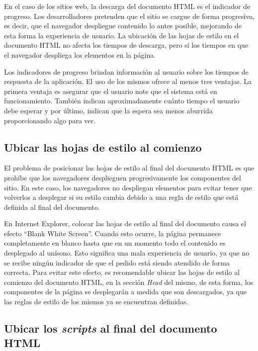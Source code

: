 En el caso de los sitios web, la descarga del documento HTML es el indicador de progreso. Los desarrolladores pretenden que el sitio se cargue de forma progresiva, es decir, que el
navegador despliegue contenido lo antes posible, mejorando de esta forma la experiencia de usuario. La ubicación de las hojas de estilo en el documento HTML no afecta
los tiempos de descarga, pero sí los tiempos en que el navegador despliega los elementos en la página.

Los indicadores de progreso brindan información al usuario sobre los tiempos de respuesta de la aplicación. El uso de los mismos ofrece al menos tres ventajas. La primera
ventaja es asegurar que el usuario note que el sistema está en funcionamiento. También indican aproximadamente cuánto tiempo el usuario debe esperar y por último, indican
que la espera sea menos aburrida proporcionando algo para ver.

\subsection{Ubicar las hojas de estilo al comienzo}

El problema de posicionar las hojas de estilo al final del documento HTML es que prohíbe que los navegadores desplieguen progresivamente los componentes del sitio.
En este caso, los navegadores no despliegan elementos para evitar tener que volverlos a desplegar si su estilo cambia debido a una regla de estilo que está definida al final del documento.

En Internet Explorer, colocar las hojas de estilo al final del documento causa el efecto ``Blank White Screen''. Cuando esto ocurre, la página permanece completamente
en blanco hasta que en un momento todo el contenido es desplegado al unísono. Esto significa una mala experiencia de usuario, ya que no se recibe ningún
indicador de que el pedido está siendo atendido de forma correcta.
Para evitar este efecto, es recomendable ubicar las hojas de estilo al comienzo del documento HTML, en la sección \emph{Head} del mismo, de esta forma, los componentes
de la página se desplegarán a medida que son descargados, ya que las reglas de estilo de los mismos ya se encuentran definidas.

\subsection{Ubicar los \emph{scripts} al final del documento HTML}

